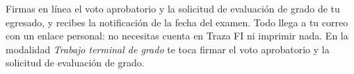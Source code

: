 \documentclass[11pt,a4paper]{article}
\begin{document}
{\small\tableofcontents}
\newpage
\begin{quevasahacer}
Firmas en línea el voto aprobatorio y la solicitud de evaluación de grado de tu egresado, y recibes la notificación de la fecha del examen. Todo llega a tu correo con un enlace personal: no necesitas cuenta en Traza FI ni imprimir nada. En la modalidad \emph{Trabajo terminal de grado} te toca firmar el voto aprobatorio y la solicitud de evaluación de grado.
\end{quevasahacer}




\end{document}
